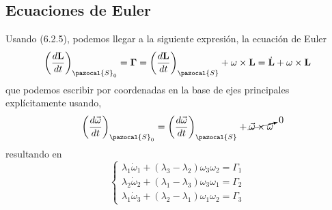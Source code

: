 \subsection{Ecuaciones de Euler}
Usando (6.2.5), podemos llegar a la siguiente expresión, la ecuación de Euler
\begin{equation} \label{6.1.1}
    \left(\frac{d\mathbf{L}}{dt}\right)_{\pazocal{S}_0} = \mathbf{\Gamma} = \left(\frac{d\mathbf{L}}{dt}\right)_{\pazocal{S}} + \omega \times \mathbf{L} = \dot{\mathbf{L}} + \omega \times \mathbf{L}
\end{equation}
que podemos escribir por coordenadas en la base de ejes principales explícitamente usando,
\begin{equation} \label{6.1.1}
    \left(\frac{d \vec{\omega}}{dt}\right)_{\pazocal{S}_0} = \left(\frac{d \vec{\omega}}{dt}\right)_\pazocal{S} + \cancelto{0}{\vec{\omega} \times \vec{\omega}}
\end{equation}
resultando en 
\begin{equation} \label{6.1.1}
    \left\{\begin{matrix}
        \lambda_1 \dot{\omega}_1 + (\lambda_3-\lambda_2) \omega_3 \omega_2 = \Gamma_1 \\
        \lambda_2 \dot{\omega}_2 + (\lambda_1-\lambda_3) \omega_3 \omega_1 = \Gamma_2\\
        \lambda_1 \dot{\omega}_3 + (\lambda_2-\lambda_1) \omega_1 \omega_2 = \Gamma_3
    \end{matrix}\right.
\end{equation}
